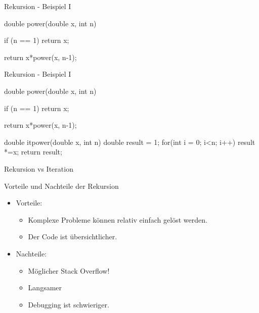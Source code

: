\ifnum\conditionmacro=1 \documentclass[handout,usenames,dvipsnames]{beamer}\fi
\begin{document}
\begin{frame}[fragile]{Rekursion - Beispiel I}
\begin{TFCpp}
double power(double x, int n){
	if (n == 1){
		return x;
	}
	
	return x*power(x, n-1);	
}
\end{TFCpp}
\end{frame}


\begin{frame}[fragile]{Rekursion - Beispiel I}
\begin{TFCpp}
double power(double x, int n){
	if (n == 1){
		return x;
	}
	
	return x*power(x, n-1);	
}

double itpower(double x, int n){
	double result = 1;	
	for(int i = 0; i<n; i++){
		result *=x;
	}
	return result;
}
\end{TFCpp}
\end{frame}

\begin{frame}{Rekursion vs Iteration}

\begin{block}{Vorteile und Nachteile der Rekursion}
\begin{itemize}
\item Vorteile:
\begin{itemize}
\item Komplexe Probleme können relativ einfach gelöst werden.
\item Der Code ist übersichtlicher.
\end{itemize}
\item Nachteile:
\begin{itemize}
\item Möglicher Stack Overflow!
\item Langsamer
\item Debugging ist schwieriger.
\end{itemize}
\end{itemize}
\end{block}
\end{frame}
\end{document}
